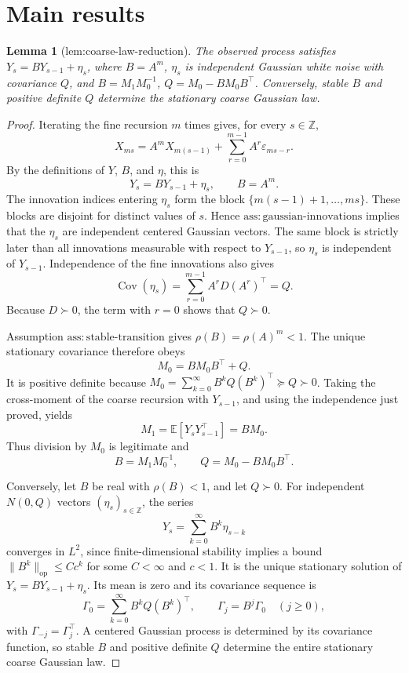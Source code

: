\documentclass{article}
\newtheorem{lemma}{Lemma}
\begin{document}
\section{Main results}

\begin{lemma}[lem:coarse-law-reduction]\label{lem:coarse-law-reduction}
The observed process satisfies \(Y_s=BY_{s-1}+\eta_s\), where \(B=A^m\), \(\eta_s\) is independent Gaussian white noise with covariance \(Q\), and \(B=M_1M_0^{-1}\), \(Q=M_0-BM_0B^\top\). Conversely, stable \(B\) and positive definite \(Q\) determine the stationary coarse Gaussian law.
\end{lemma}
\begin{proof}
Iterating the fine recursion \(m\) times gives, for every \(s\in\mathbb Z\),
\[
 X_{ms}=A^mX_{m(s-1)}+\sum_{r=0}^{m-1}A^r\varepsilon_{ms-r}.
\]
By the definitions of \(Y\), \(B\), and \(\eta\), this is
\[
 Y_s=BY_{s-1}+\eta_s,
 \qquad B=A^m.
\]
The innovation indices entering \(\eta_s\) form the block
\(\{m(s-1)+1,\ldots,ms\}\). These blocks are disjoint for distinct values of
\(s\). Hence \(\mathrm{ass{:}gaussian\mbox{-}innovations}\) implies that the
\(\eta_s\) are independent centered Gaussian vectors. The same block is
strictly later than all innovations measurable with respect to
\(Y_{s-1}\), so \(\eta_s\) is independent of \(Y_{s-1}\). Independence of
the fine innovations also gives
\[
 \operatorname{Cov}(\eta_s)
 =\sum_{r=0}^{m-1}A^rD(A^r)^\top=Q.
\]
Because \(D\succ0\), the term with \(r=0\) shows that \(Q\succ0\).

Assumption \(\mathrm{ass{:}stable\mbox{-}transition}\) gives
\(\rho(B)=\rho(A)^m<1\). The unique stationary covariance therefore obeys
\[
 M_0=BM_0B^\top+Q.
\]
It is positive definite because
\(M_0=\sum_{k=0}^{\infty}B^kQ(B^k)^\top\succeq Q\succ0\). Taking the
cross-moment of the coarse recursion with \(Y_{s-1}\), and using the
independence just proved, yields
\[
 M_1=\mathbb E[Y_sY_{s-1}^\top]=BM_0.
\]
Thus division by \(M_0\) is legitimate and
\[
 B=M_1M_0^{-1},
 \qquad Q=M_0-BM_0B^\top.
\]

Conversely, let \(B\) be real with \(\rho(B)<1\), and let \(Q\succ0\).
For independent \(N(0,Q)\) vectors \((\eta_s)_{s\in\mathbb Z}\), the series
\[
 Y_s=\sum_{k=0}^{\infty}B^k\eta_{s-k}
\]
converges in \(L^2\), since finite-dimensional stability implies a bound
\(\lVert B^k\rVert_{\mathrm{op}}\le Cc^k\) for some \(C<\infty\) and
\(c<1\). It is the unique stationary solution of
\(Y_s=BY_{s-1}+\eta_s\). Its mean is zero and its covariance sequence is
\[
 \Gamma_0=\sum_{k=0}^{\infty}B^kQ(B^k)^\top,
 \qquad \Gamma_j=B^j\Gamma_0\quad(j\ge0),
\]
with \(\Gamma_{-j}=\Gamma_j^\top\). A centered Gaussian process is determined
by its covariance function, so stable \(B\) and positive definite \(Q\)
determine the entire stationary coarse Gaussian law.
\end{proof}
\end{document}
